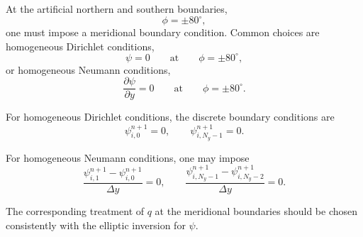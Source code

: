 \documentclass[11pt]{article}
\begin{document}
At the artificial northern and southern boundaries,
\[
\phi=\pm 80^\circ,
\]
one must impose a meridional boundary condition. Common choices are homogeneous
Dirichlet conditions,
\[
\psi=0
\qquad
\text{at}
\qquad
\phi=\pm 80^\circ,
\]
or homogeneous Neumann conditions,
\[
\frac{\partial \psi}{\partial y}=0
\qquad
\text{at}
\qquad
\phi=\pm 80^\circ.
\]

For homogeneous Dirichlet conditions, the discrete boundary conditions are
\[
\psi_{i,0}^{n+1}=0,
\qquad
\psi_{i,N_y-1}^{n+1}=0.
\]

For homogeneous Neumann conditions, one may impose
\[
\frac{\psi_{i,1}^{n+1}-\psi_{i,0}^{n+1}}{\Delta y}=0,
\qquad
\frac{\psi_{i,N_y-1}^{n+1}-\psi_{i,N_y-2}^{n+1}}{\Delta y}=0.
\]

The corresponding treatment of \(q\) at the meridional boundaries should be chosen
consistently with the elliptic inversion for \(\psi\).
\end{document}
